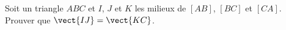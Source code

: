 
\begin{exercice}\label{exosmath-0142}

    Soit un triangle \( ABC\) et \( I\), \( J\) et \( K\) les milieux de \( [AB]\), \( [BC]\) et \( [CA]\). Prouver que \( \vect{ IJ }=\vect{ KC }\).

\end{exercice}
